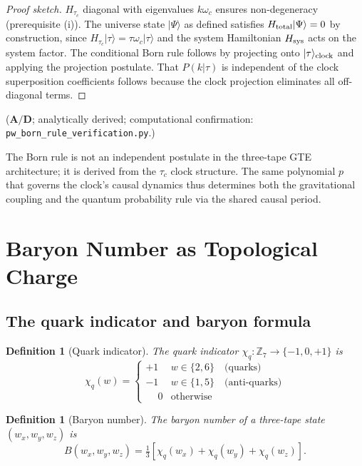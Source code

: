 \documentclass[11pt]{article}
\newtheorem{definition}[theorem]{Definition}
\theoremstyle{remark}
\newcommand{\ZS}{\mathbb{Z}_7}
\newcommand{\CatAD}{\textbf{A/D}}
\begin{document}
\begin{proof}[Proof sketch]
$H_{\tau_c}$ diagonal with eigenvalues $k\omega_c$ ensures non-degeneracy
(prerequisite (i)). The universe state $|\Psi\rangle$ as defined satisfies
$H_{\rm total}|\Psi\rangle = 0$ by construction, since $H_{\tau_c}|\tau\rangle =
\tau\omega_c|\tau\rangle$ and the system Hamiltonian $H_{\rm sys}$ acts on the
system factor. The conditional Born rule follows by projecting onto
$|\tau\rangle_{\rm clock}$ and applying the projection postulate.
That $P(k|\tau)$ is independent of the clock superposition coefficients follows
because the clock projection eliminates all off-diagonal terms.
\end{proof}

\noindent
($\CatAD$; analytically derived; computational confirmation:
\texttt{pw\_born\_rule\_verification.py}.)

The Born rule is not an independent postulate in the three-tape GTE architecture;
it is derived from the $\tau_c$ clock structure. The same polynomial $p$ that
governs the clock's causal dynamics thus determines both the gravitational coupling
and the quantum probability rule via the shared causal period.

\section{Baryon Number as Topological Charge}
\label{sec:baryon}

\subsection{The quark indicator and baryon formula}
\label{ssec:baryon_formula}

\begin{definition}[Quark indicator]
The quark indicator $\chi_q:\ZS\to\{-1,0,+1\}$ is
\[
  \chi_q(w) = \begin{cases}
    +1 & w \in \{2,6\} \quad\text{(quarks)}\\
    -1 & w \in \{1,5\} \quad\text{(anti-quarks)}\\
    \phantom{+}0 & \text{otherwise}
  \end{cases}
\]
\end{definition}

\begin{definition}[Baryon number]
The baryon number of a three-tape state $(w_x,w_y,w_z)$ is
\[
  B(w_x,w_y,w_z) = \tfrac{1}{3}\left[\chi_q(w_x) + \chi_q(w_y)
  + \chi_q(w_z)\right].
\]
\end{definition}
\end{document}
